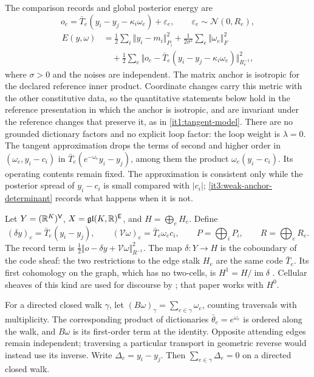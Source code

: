 The comparison records and global posterior energy are
\begin{equation}
o_e=\bar T_e(y_i-y_j-\kappa_i\omega_e)+\varepsilon_e,
\qquad\varepsilon_e\sim\mathcal N(0,R_e),
\end{equation}
\begin{equation}
\begin{aligned}
E(y,\omega)&=\frac12\sum_i\Vert y_i-m_i\Vert_{P_i}^2
+\frac1{2\sigma^2}\sum_e\Vert\omega_e\Vert_F^2\\
&\quad+\frac12\sum_e\Vert o_e-\bar T_e(y_i-y_j-\kappa_i\omega_e)\Vert_{R_e^{-1}}^2,
\end{aligned}
\label{it3:energy}
\end{equation}
where $\sigma>0$ and the noises are independent. The matrix anchor is isotropic for the declared reference inner product. Coordinate changes carry this metric with the other constitutive data, so the quantitative statements below hold in the reference presentation in which the anchor is isotropic, and are invariant under the reference changes that preserve it, as in \cref{it1:tangent-model}. There are no grounded dictionary factors and no explicit loop factor: the loop weight is $\lambda=0$. The tangent approximation drops the terms of second and higher order in $(\omega_e,y_i-c_i)$ in $\bar T_e(e^{-\omega_e}y_i-y_j)$, among them the product $\omega_e(y_i-c_i)$. Its operating contents remain fixed. The approximation is consistent only while the posterior spread of $y_i-c_i$ is small compared with $|c_i|$; \cref{it3:weak-anchor-determinant} records what happens when it is not.

Let $Y=(\mathbb R^K)^{\mathsf V}$, $X=\mathfrak{gl}(K,\mathbb R)^{\mathsf E}$, and $H=\bigoplus_e H_e$. Define
\begin{equation}
(\delta y)_e=\bar T_e(y_i-y_j),\qquad
(\mathcal V\omega)_e=\bar T_e\omega_ec_i,\qquad
P=\bigoplus_iP_i,\qquad R=\bigoplus_eR_e.
\end{equation}
The record term is $\frac12\Vert o-\delta y+\mathcal V\omega\Vert_{R^{-1}}^2$. The map $\delta:Y\to H$ is the coboundary of the code sheaf: the two restrictions to the edge stalk $H_e$ are the same code $\bar T_e$. Its first cohomology on the graph, which has no two-cells, is $H^1=H/\operatorname{im}\delta$ \citep[Section~2.2]{HansenGhrist2019}. Cellular sheaves of this kind are used for discourse by \citet{HansenGhrist2021}; that paper works with $H^0$.

For a directed closed walk $\gamma$, let $(B\omega)_\gamma=\sum_{e\in\gamma}\omega_e$, counting traversals with multiplicity. The corresponding product of dictionaries $\bar\theta_e=e^{\omega_e}$ is ordered along the walk, and $B\omega$ is its first-order term at the identity. Opposite attending edges remain independent; traversing a particular transport in geometric reverse would instead use its inverse. Write $\Delta_e=y_i-y_j$. Then $\sum_{e\in\gamma}\Delta_e=0$ on a directed closed walk.


